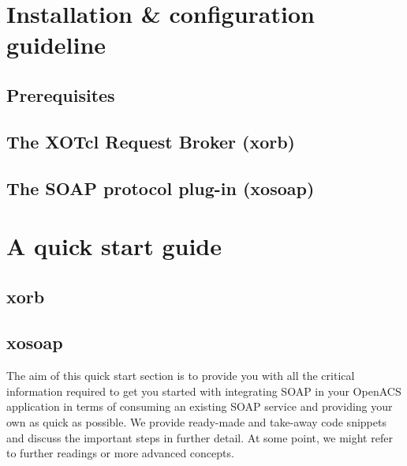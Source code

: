      \section{Installation \& configuration guideline}
     	\subsection{Prerequisites}
	\subsection{The XOTcl Request Broker (xorb)}
 
	\subsection{The SOAP protocol plug-in (xosoap)}
  \section{A quick start guide}\label{sec:quickstart}
  \subsection{xorb}\label{sec:quickstart:xorb}
  \subsection{xosoap}\label{sec:quickstart:xosoap}
  The aim of this quick start section is to provide you with all the critical information required to get you started with integrating SOAP in your OpenACS application in terms of consuming an existing SOAP service and providing your own as quick as possible. We provide ready-made and take-away code snippets and discuss the important steps in further detail. At some point, we might refer to further readings or more advanced concepts. 
